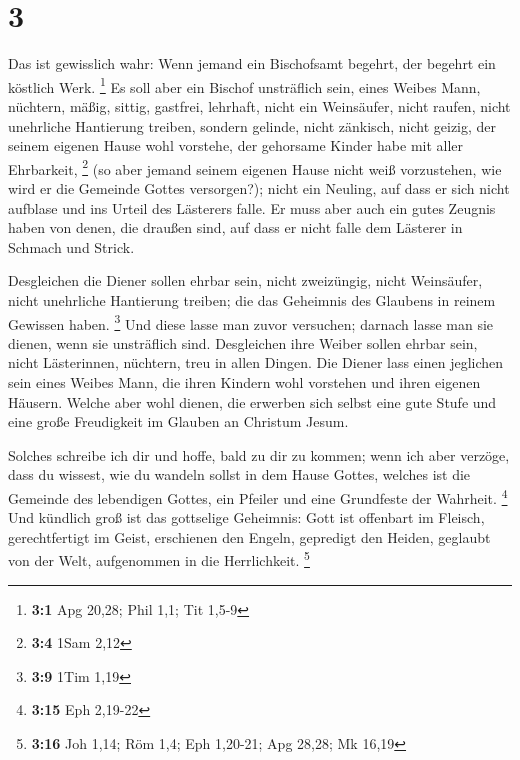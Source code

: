 \hypertarget{section-2}{%
\section{3}\label{section-2}}

 Das ist gewisslich wahr: Wenn jemand ein Bischofsamt
begehrt, der begehrt ein köstlich Werk. \footnote{\textbf{3:1} Apg
  20,28; Phil 1,1; Tit 1,5-9}  Es soll aber ein Bischof
unsträflich sein, eines Weibes Mann, nüchtern, mäßig, sittig, gastfrei,
lehrhaft,  nicht ein Weinsäufer, nicht raufen, nicht
unehrliche Hantierung treiben, sondern gelinde, nicht zänkisch, nicht
geizig,  der seinem eigenen Hause wohl vorstehe, der
gehorsame Kinder habe mit aller Ehrbarkeit, \footnote{\textbf{3:4} 1Sam
  2,12}  (so aber jemand seinem eigenen Hause nicht weiß
vorzustehen, wie wird er die Gemeinde Gottes versorgen?); 
nicht ein Neuling, auf dass er sich nicht aufblase und ins Urteil des
Lästerers falle.  Er muss aber auch ein gutes Zeugnis
haben von denen, die draußen sind, auf dass er nicht falle dem Lästerer
in Schmach und Strick.

 Desgleichen die Diener sollen ehrbar sein, nicht
zweizüngig, nicht Weinsäufer, nicht unehrliche Hantierung treiben;
 die das Geheimnis des Glaubens in reinem Gewissen haben.
\footnote{\textbf{3:9} 1Tim 1,19}  Und diese lasse man
zuvor versuchen; darnach lasse man sie dienen, wenn sie unsträflich
sind.  Desgleichen ihre Weiber sollen ehrbar sein, nicht
Lästerinnen, nüchtern, treu in allen Dingen.  Die Diener
lass einen jeglichen sein eines Weibes Mann, die ihren Kindern wohl
vorstehen und ihren eigenen Häusern.  Welche aber wohl
dienen, die erwerben sich selbst eine gute Stufe und eine große
Freudigkeit im Glauben an Christum Jesum.

 Solches schreibe ich dir und hoffe, bald zu dir zu
kommen;  wenn ich aber verzöge, dass du wissest, wie du
wandeln sollst in dem Hause Gottes, welches ist die Gemeinde des
lebendigen Gottes, ein Pfeiler und eine Grundfeste der Wahrheit.
\footnote{\textbf{3:15} Eph 2,19-22}  Und kündlich groß
ist das gottselige Geheimnis: Gott ist offenbart im Fleisch,
gerechtfertigt im Geist, erschienen den Engeln, gepredigt den Heiden,
geglaubt von der Welt, aufgenommen in die Herrlichkeit. \footnote{\textbf{3:16}
  Joh 1,14; Röm 1,4; Eph 1,20-21; Apg 28,28; Mk 16,19}

